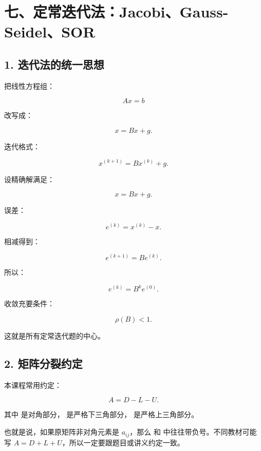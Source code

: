 \documentclass[11pt,a4paper]{ctexart}
\newcommand{\code}[1]{\begingroup\ttfamily\small #1\endgroup}
\begin{document}
\section*{七、定常迭代法：Jacobi、Gauss-Seidel、SOR}



\subsection*{1. 迭代法的统一思想}


把线性方程组：

\[
Ax=b
\]

改写成：

\[
x=Bx+g.
\]

迭代格式：

\[
x^{(k+1)}=Bx^{(k)}+g.
\]

设精确解满足：

\[
x=Bx+g.
\]

误差：

\[
e^{(k)}=x^{(k)}-x.
\]

相减得到：

\[
e^{(k+1)}=Be^{(k)}.
\]

所以：

\[
e^{(k)}=B^ke^{(0)}.
\]

收敛充要条件：

\[
\rho(B)<1.
\]

这就是所有定常迭代题的中心。


\subsection*{2. 矩阵分裂约定}


本课程常用约定：

\[
A=D-L-U.
\]

其中 \code{} 是对角部分，\code{} 是严格下三角部分，\code{} 是严格上三角部分。

也就是说，如果原矩阵非对角元素是 $a_{ij}$，那么 \code{} 和 \code{} 中往往带负号。不同教材可能写 $A=D+L+U$，所以一定要跟题目或讲义约定一致。
\end{document}
